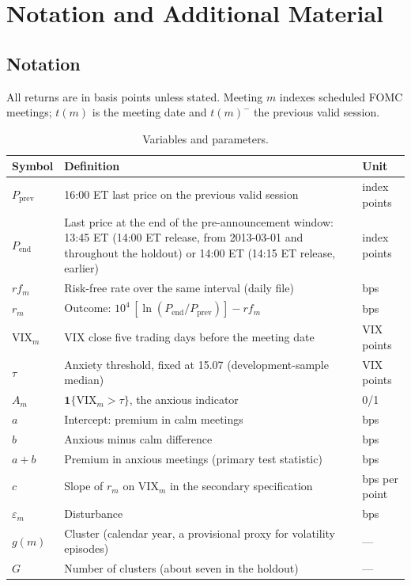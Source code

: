 \section{Notation and Additional Material}
\label{app:notation}

\subsection{Notation}
All returns are in basis points unless stated. Meeting $m$ indexes scheduled FOMC meetings; $t(m)$ is the meeting date and $t(m)^{-}$ the previous valid session.

\begin{table}[ht]
\centering
\small
\begin{tabular}{@{}lp{}l@{}}
\hline
Symbol & Definition & Unit \\
\hline
$P_{\mathrm{prev}}$ & 16:00 ET last price on the previous valid session & index points \\
$P_{\mathrm{end}}$ & Last price at the end of the pre-announcement window: 13:45 ET (14:00 ET release, from 2013-03-01 and throughout the holdout) or 14:00 ET (14:15 ET release, earlier) & index points \\
$rf_m$ & Risk-free rate over the same interval (daily file) & bps \\
$r_m$ & Outcome: $10^{4}\,[\ln(P_{\mathrm{end}}/P_{\mathrm{prev}})] - rf_m$ & bps \\
$\mathrm{VIX}_m$ & VIX close five trading days before the meeting date & VIX points \\
$\tau$ & Anxiety threshold, fixed at 15.07 (development-sample median) & VIX points \\
$A_m$ & $\mathbf{1}\{\mathrm{VIX}_m > \tau\}$, the anxious indicator & 0/1 \\
$a$ & Intercept: premium in calm meetings & bps \\
$b$ & Anxious minus calm difference & bps \\
$a+b$ & Premium in anxious meetings (primary test statistic) & bps \\
$c$ & Slope of $r_m$ on $\mathrm{VIX}_m$ in the secondary specification & bps per point \\
$\varepsilon_m$ & Disturbance & bps \\
$g(m)$ & Cluster (calendar year, a provisional proxy for volatility episodes) & --- \\
$G$ & Number of clusters (about seven in the holdout) & --- \\
\hline
\end{tabular}
\caption{Variables and parameters.}
\end{table}

